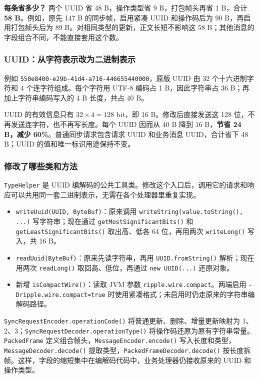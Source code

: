 \documentclass[UTF8,a4paper,11pt,fontset=fandol]{ctexart}
\newcommand{\code}[1]{\nolinkurl{#1}}
\begin{document}
\textbf{每条省多少？} 两个 UUID 省 48 B，操作类型省 9 B，打包帧头再省 1 B，合计 \textbf{58 B}。例如，原先 147 B 的同步帧，启用紧凑 UUID 和操作码后为 90 B，再启用打包帧头后为 89 B。对相同类型的更新，正文长短不影响这 58 B；其他消息的字段组合不同，不能直接套用这个数。

\subsubsection{UUID：从字符表示改为二进制表示}
例如 \code{550e8400-e29b-41d4-a716-446655440000}，原版 UUID 由 32 个十六进制字符和 4 个连字符组成。每个字符用 UTF-8 编码占 1 B，因此字符串占 36 B；再加上字符串编码写入的 4 B 长度，共占 40 B。

UUID 的有效信息只有 $32\times4=128$ bit，即 16 B。修改后直接发送这 128 位，不再发送连字符，也不再写长度。每个 UUID 因而从 40 B 降到 16 B，\textbf{节省 24 B，减少 60\%}。普通同步请求包含请求 UUID 和业务消息 UUID，合计省下 48 B；UUID 的值和唯一标识用途保持不变。

\subsubsection{修改了哪些类和方法}
\code{TypeHelper} 是 UUID 编解码的公共工具类。修改这个入口后，调用它的请求和响应可以共用同一套二进制表示，无需在各个处理器里重复实现。
\begin{itemize}\setlength{\itemsep}{2pt}
\item \code{writeUuid(UUID, ByteBuf)}：原来调用 \code{writeString(value.toString(), ...)} 写字符串；现在通过 \code{getMostSignificantBits()} 和 \code{getLeastSignificantBits()} 取出高、低各 64 位，再用两次 \code{writeLong()} 写入，共 16 B。
\item \code{readUuid(ByteBuf)}：原来先读字符串，再用 \code{UUID.fromString()} 解析；现在用两次 \code{readLong()} 取回高、低位，再通过 \code{new UUID(...)} 还原对象。
\item 新增 \code{isCompactWire()}：读取 JVM 参数 \code{ripple.wire.compact}。两端启用 \code{-Dripple.wire.compact=true} 时使用紧凑格式；未启用时仍走原来的字符串编解码路径。
\end{itemize}

\code{SyncRequestEncoder.operationCode()} 将普通更新、删除、增量更新映射为 1、2、3；\code{SyncRequestDecoder.operationType()} 将操作码还原为原有字符串常量。\code{PackedFrame} 定义组合帧头，\code{MessageEncoder.encode()} 写入长度和类型，\code{MessageDecoder.decode()} 提取类型，\code{PackedFrameDecoder.decode()} 按长度拆帧。这样，字段的缩短集中在编解码代码中，业务处理器仍接收原来的 UUID 和操作类型。
\end{document}
